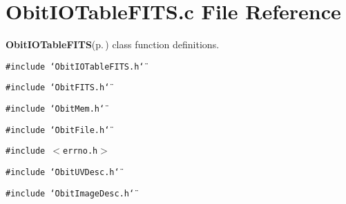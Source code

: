 \section{Obit\-IOTable\-FITS.c File Reference}
\label{ObitIOTableFITS_8c}
{\bf Obit\-IOTable\-FITS}{\rm (p.\,\pageref{structObitIOTableFITS})} class function definitions. 

{\tt \#include \char`\"{}Obit\-IOTable\-FITS.h\char`\"{}}\par
{\tt \#include \char`\"{}Obit\-FITS.h\char`\"{}}\par
{\tt \#include \char`\"{}Obit\-Mem.h\char`\"{}}\par
{\tt \#include \char`\"{}Obit\-File.h\char`\"{}}\par
{\tt \#include $<$errno.h$>$}\par
{\tt \#include \char`\"{}Obit\-UVDesc.h\char`\"{}}\par
{\tt \#include \char`\"{}Obit\-Image\-Desc.h\char`\"{}}\par

